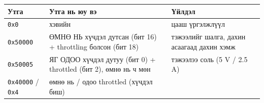 \begingroup\scriptsize\begin{longtable}[]{@{}lll@{}}
\toprule
\begin{minipage}[b]{0.30\columnwidth}\raggedright
Утга\strut
\end{minipage} & \begin{minipage}[b]{0.30\columnwidth}\raggedright
Утга нь юу вэ\strut
\end{minipage} & \begin{minipage}[b]{0.30\columnwidth}\raggedright
Үйлдэл\strut
\end{minipage}\tabularnewline
\midrule
\endhead
\begin{minipage}[t]{0.30\columnwidth}\raggedright
\texttt{0x0}\strut
\end{minipage} & \begin{minipage}[t]{0.30\columnwidth}\raggedright
хэвийн\strut
\end{minipage} & \begin{minipage}[t]{0.30\columnwidth}\raggedright
цааш үргэлжлүүл\strut
\end{minipage}\tabularnewline
\begin{minipage}[t]{0.30\columnwidth}\raggedright
\texttt{0x50000}\strut
\end{minipage} & \begin{minipage}[t]{0.30\columnwidth}\raggedright
ӨМНӨ НЬ хүчдэл дутсан (бит 16) + throttling болсон (бит 18)\strut
\end{minipage} & \begin{minipage}[t]{0.30\columnwidth}\raggedright
тэжээлийг шалга, дахин асаагаад дахин хэмж\strut
\end{minipage}\tabularnewline
\begin{minipage}[t]{0.30\columnwidth}\raggedright
\texttt{0x50005}\strut
\end{minipage} & \begin{minipage}[t]{0.30\columnwidth}\raggedright
ЯГ ОДОО хүчдэл дутуу (бит 0) + throttled (бит 2), өмнө нь ч мөн\strut
\end{minipage} & \begin{minipage}[t]{0.30\columnwidth}\raggedright
тэжээлээ соль (5 V / 2.5 A)\strut
\end{minipage}\tabularnewline
\begin{minipage}[t]{0.30\columnwidth}\raggedright
\texttt{0x40000} / \texttt{0x4}\strut
\end{minipage} & \begin{minipage}[t]{0.30\columnwidth}\raggedright
өмнө нь / одоо throttled (хүчдэл биш)\strut

\end{minipage}
\end{longtable}
